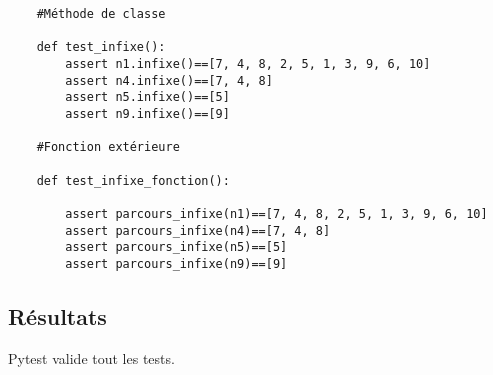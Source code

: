 \documentclass{article}
\begin{document}
\renewcommand{\theFancyVerbLine}{
  \sffamily\textcolor[rgb]{0.5,0.5,0.5}{\scriptsize\arabic{FancyVerbLine}}}

\begin{verbatim}
    #Méthode de classe

    def test_infixe():
        assert n1.infixe()==[7, 4, 8, 2, 5, 1, 3, 9, 6, 10]
        assert n4.infixe()==[7, 4, 8]
        assert n5.infixe()==[5]
        assert n9.infixe()==[9]

    #Fonction extérieure

    def test_infixe_fonction():
    
        assert parcours_infixe(n1)==[7, 4, 8, 2, 5, 1, 3, 9, 6, 10]
        assert parcours_infixe(n4)==[7, 4, 8]
        assert parcours_infixe(n5)==[5]
        assert parcours_infixe(n9)==[9]
\end{verbatim}
\subsection{Résultats}
Pytest valide tout les tests.
\end{document}

